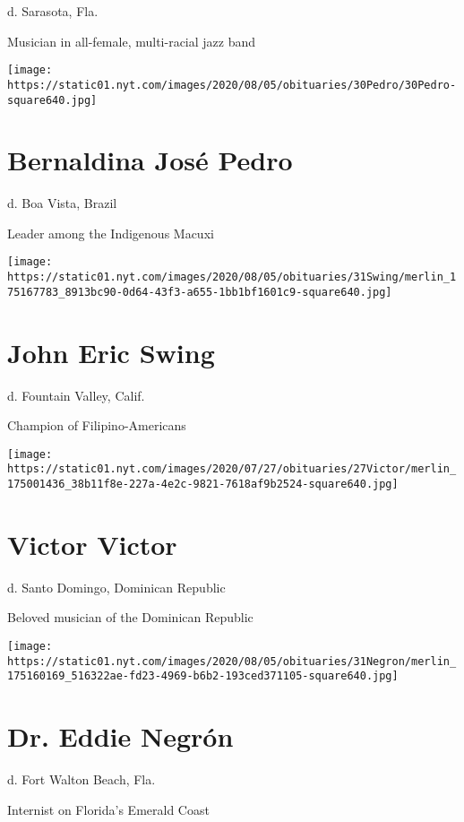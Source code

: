 d. Sarasota, Fla.

Musician in all-female, multi-racial jazz band

\texttt{[image: https://static01.nyt.com/images/2020/08/05/obituaries/30Pedro/30Pedro-square640.jpg]}

\hypertarget{bernaldina-josuxe9-pedro}{%
\section{Bernaldina José Pedro}\label{bernaldina-josuxe9-pedro}}

d. Boa Vista, Brazil

Leader among the Indigenous Macuxi

\texttt{[image: https://static01.nyt.com/images/2020/08/05/obituaries/31Swing/merlin\_175167783\_8913bc90-0d64-43f3-a655-1bb1bf1601c9-square640.jpg]}

\hypertarget{john-eric-swing}{%
\section{John Eric Swing}\label{john-eric-swing}}

d. Fountain Valley, Calif.

Champion of Filipino-Americans

\texttt{[image: https://static01.nyt.com/images/2020/07/27/obituaries/27Victor/merlin\_175001436\_38b11f8e-227a-4e2c-9821-7618af9b2524-square640.jpg]}

\hypertarget{victor-victor}{%
\section{Victor Victor}\label{victor-victor}}

d. Santo Domingo, Dominican Republic

Beloved musician of the Dominican Republic

\texttt{[image: https://static01.nyt.com/images/2020/08/05/obituaries/31Negron/merlin\_175160169\_516322ae-fd23-4969-b6b2-193ced371105-square640.jpg]}

\hypertarget{dr-eddie-negruxf3n}{%
\section{Dr. Eddie Negrón}\label{dr-eddie-negruxf3n}}

d. Fort Walton Beach, Fla.

Internist on Florida's Emerald Coast


